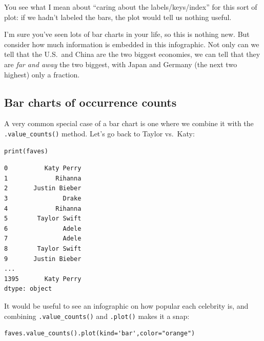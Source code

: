 You see what I mean about ``caring about the labels/keys/index'' for this sort
of plot: if we hadn't labeled the bars, the plot would tell us nothing useful.

I'm sure you've seen lots of bar charts in your life, so this is nothing new.
But consider how much information is embedded in this infographic. Not only can
we tell that the U.S.~and China are the two biggest economies, we can tell that
they are \textit{far and away} the two biggest, with Japan and Germany (the
next two highest) only a fraction.

\subsection{Bar charts of occurrence counts}

\label{categoricalDataBarCharts}


A very common special case of a bar chart is one where we combine it with the
\texttt{.value\_counts()} method. Let's go back to Taylor vs.~Katy:

\begin{Verbatim}[fontsize=\scriptsize,samepage=true,frame=single,framesep=3mm]
print(faves)
\end{Verbatim}
\vspace{-.3in}

\begin{Verbatim}[fontsize=\scriptsize,samepage=true,frame=leftline,framesep=5mm,framerule=1mm]
0          Katy Perry
1             Rihanna
2       Justin Bieber
3               Drake
4             Rihanna
5        Taylor Swift
6               Adele
7               Adele
8        Taylor Swift
9       Justin Bieber
...
1395       Katy Perry
dtype: object
\end{Verbatim}


It would be useful to see an infographic on how popular each celebrity is, and
combining \texttt{.value\_counts()} and \texttt{.plot()} makes it a snap:

\begin{Verbatim}[fontsize=\small,samepage=true,frame=single,framesep=3mm]
faves.value_counts().plot(kind='bar',color="orange")
\end{Verbatim}

